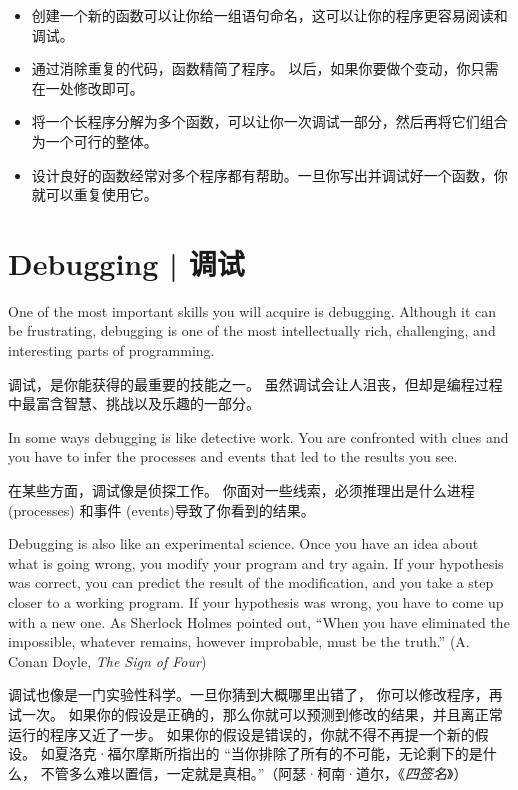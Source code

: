 \begin{itemize}

\item 创建一个新的函数可以让你给一组语句命名，这可以让你的程序更容易阅读和调试。

\item 通过消除重复的代码，函数精简了程序。 以后，如果你要做个变动，你只需在一处修改即可。

\item 将一个长程序分解为多个函数，可以让你一次调试一部分，然后再将它们组合为一个可行的整体。

\item 设计良好的函数经常对多个程序都有帮助。一旦你写出并调试好一个函数，你就可以重复使用它。

\end{itemize}


%
\section{Debugging  |  调试}
\index{debug]}

One of the most important skills you will acquire is debugging.
Although it can be frustrating, debugging is one of the most
intellectually rich, challenging, and interesting parts of
programming.

调试，是你能获得的最重要的技能之一。
虽然调试会让人沮丧，但却是编程过程中最富含智慧、挑战以及乐趣的一部分。
  

In some ways debugging is like detective work.  You are confronted
with clues and you have to infer the processes and events that led
to the results you see.

在某些方面，调试像是侦探工作。
你面对一些线索，必须推理出是什么进程 (processes) 和事件 (events)导致了你看到的结果。

Debugging is also like an experimental science.  Once you have an idea
about what is going wrong, you modify your program and try again.  If
your hypothesis was correct, you can predict the result of the
modification, and you take a step closer to a working program.  If
your hypothesis was wrong, you have to come up with a new one.  As
Sherlock Holmes pointed out, ``When you have eliminated the
impossible, whatever remains, however improbable, must be the truth.''
(A. Conan Doyle, {\em The Sign of Four})

调试也像是一门实验性科学。一旦你猜到大概哪里出错了，
你可以修改程序，再试一次。
如果你的假设是正确的，那么你就可以预测到修改的结果，并且离正常运行的程序又近了一步。
如果你的假设是错误的，你就不得不再提一个新的假设。
如夏洛克·福尔摩斯所指出的 ``当你排除了所有的不可能，无论剩下的是什么，
不管多么难以置信，一定就是真相。''（阿瑟·柯南·道尔，《\emph{四签名}》）
  

